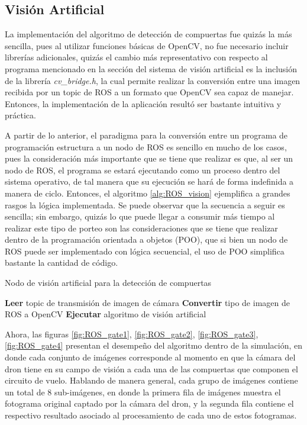 \subsection{Visión Artificial}
La implementación del algoritmo de detección de compuertas fue quizás la más sencilla, pues al utilizar funciones básicas de OpenCV, no fue necesario incluir librerías adicionales, quizás el cambio más representativo con respecto al programa mencionado en la sección del sistema de visión artificial es la inclusión de la librería \textit{cv\_bridge.h}, la cual permite realizar la conversión entre una imagen recibida por un topic de ROS a un formato que OpenCV sea capaz de manejar. Entonces, la implementación de la aplicación resultó ser bastante intuitiva y práctica.

A partir de lo anterior, el paradigma para la conversión entre un programa de programación estructura a un nodo de ROS es sencillo en mucho de los casos, pues la consideración más importante que se tiene que realizar es que, al ser un nodo de ROS, el programa se estará ejecutando como un proceso dentro del sistema operativo, de tal manera que su ejecución se hará de forma indefinida a manera de ciclo. Entonces, el algoritmo \ref{alg:ROS_vision} ejemplifica a grandes rasgos la lógica implementada. Se puede observar que la secuencia a seguir es sencilla; sin embargo, quizás lo que puede llegar a consumir más tiempo al realizar este tipo de porteo son las consideraciones que se tiene que realizar dentro de la programación orientada a objetos (POO), que si bien un nodo de ROS puede ser implementado con lógica secuencial, el uso de POO simplifica bastante la cantidad de código.


\begin{algorithm}
    \caption{Nodo de visión artificial para la detección de compuertas}\label{alg:ROS_vision}
    \begin{algorithmic}
    \State \textbf{Leer} topic de transmisión de imagen de cámara
    \State \textbf{Convertir} tipo de imagen de ROS a OpenCV
    \State \textbf{Ejecutar} algoritmo de visión artificial
    \EndWhile
\end{algorithmic}
\end{algorithm}

Ahora, las figuras \ref{fig:ROS_gate1}, \ref{fig:ROS_gate2}, \ref{fig:ROS_gate3}, \ref{fig:ROS_gate4} presentan el desempeño del algoritmo dentro de la simulación, en donde cada conjunto de imágenes corresponde al momento en que la cámara del dron tiene en su campo de visión a cada una de las compuertas que componen el circuito de vuelo. Hablando de manera general, cada grupo de imágenes contiene un total de 8 sub-imágenes, en donde la primera fila de imágenes muestra el fotograma original captado por la cámara del dron, y la segunda fila contiene el respectivo resultado asociado al procesamiento de cada uno de estos fotogramas.

